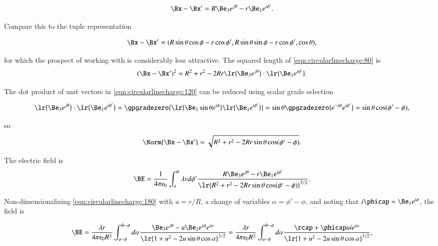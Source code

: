 \begin{dmath}\label{eqn:circularlinecharge:80}
\Bx - \Bx'
=
R \Be_3 e^{j \theta } - r \Be_1 e^{i \phi'}.
\end{dmath}

Compare this to the tuple representation

\begin{dmath}\label{eqn:circularlinecharge:100}
\Bx - \Bx'
= ( R \sin\theta \cos\phi - r \cos\phi', R \sin\theta \sin\phi - r \cos\phi', \cos\theta ),
\end{dmath}

for which the prospect of working with is considerably less attractive.  The squared length of \cref{eqn:circularlinecharge:80} is
\begin{dmath}\label{eqn:circularlinecharge:120}
(\Bx - \Bx')^2
=
R^2 + r^2 - 2 R r \lr{\Be_3 e^{j \theta} } \cdot \lr{ \Be_1 e^{i \phi'} }.
\end{dmath}

The dot product of unit vectors in \cref{eqn:circularlinecharge:120} can be reduced using scalar grade selection

\begin{dmath}\label{eqn:circularlinecharge:140}
\lr{\Be_3 e^{j \theta }} \cdot \lr{ \Be_1 e^{i \phi'} }
=
\gpgradezero{
\lr{ \Be_1 \sin\theta e^{i \phi} } \lr{ \Be_1 e^{i \phi'}}
}
=
\sin\theta
\gpgradezero{
e^{-i \phi} e^{i \phi'}
}
=
\sin\theta \cos( \phi' - \phi ),
\end{dmath}

so
\begin{dmath}\label{eqn:circularlinecharge:160}
\Norm{ \Bx - \Bx' }
=
\sqrt{
R^2 + r^2 - 2 R r \sin\theta \cos( \phi' - \phi )
}.
\end{dmath}

The electric field is
\begin{dmath}\label{eqn:circularlinecharge:180}
\BE = \frac{1}{4 \pi \epsilon_0} \int_a^b \lambda r d\phi' \frac{ R \Be_3 e^{j \theta } - r \Be_1 e^{i \phi'} }{\lr{ R^2 + r^2 - 2 R r \sin\theta \cos( \phi' - \phi ) }^{3/2} }.
\end{dmath}

Non-dimensionalizing \cref{eqn:circularlinecharge:180} with \( u = r/R \), a change of variables \( \alpha = \phi' - \phi \), and noting that \( i \phicap = \Be_1 e^{i \phi} \), the field is

\begin{dmath}\label{eqn:circularlinecharge:200}
\BE
= \frac{\lambda r}{4 \pi \epsilon_0 R^2} \int_{a-\phi}^{b-\phi} d\alpha \frac{ \Be_3 e^{j \theta } - u \Be_1 e^{i\phi} e^{i \alpha} }{\lr{ 1 + u^2 - 2 u \sin\theta \cos \alpha }^{3/2} }
= \frac{\lambda r}{4 \pi \epsilon_0 R^2} \int_{a-\phi}^{b-\phi} d\alpha \frac{ \rcap + \phicap u i e^{i \alpha } }{\lr{ 1 + u^2 - 2 u \sin\theta \cos \alpha }^{3/2} },
\end{dmath}

